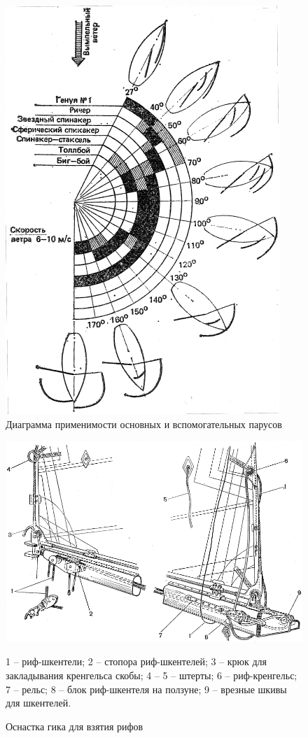 \documentclass[a4paper, 12pt, twoside, final, book, russian, fittopage, cyremdash]{ncc}
\begin{document}
\begin{figure}[htb]
  \centering{}
  \includegraphics[scale=1.2]{0044P}
  \caption{Диаграмма применимости основных и вспомогательных парусов}
  \label{fig:44}
\end{figure}

\begin{figure}[htb]
  \centering{}
  \includegraphics[scale=1.3]{0045P}
  \caption{Оснастка гика для взятия рифов}
  \label{fig:45}
  \small
  1 \--- риф-шкентели; 2 \---  стопора риф-шкентелей; 3 \--- крюк для закладывания кренгельса скобы; 4 \--- 5 \--- штерты; 6 \--- риф-кренгельс; 7 \--- рельс; 8 \--- блок риф-шкентеля на ползуне; 9 \--- врезные шкивы для шкентелей. 
\end{figure}
\end{document}
